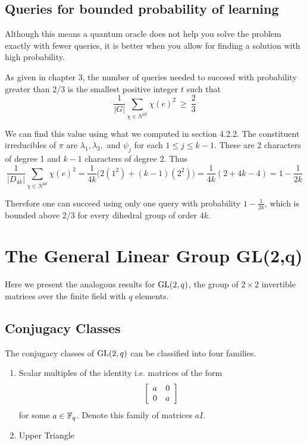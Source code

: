 \subsection{Queries for bounded probability of learning}
Although this means a quantum oracle does not help you solve the problem exactly with fewer queries, it is better 
when you allow for finding a solution with high probability.

As given in chapter 3, the number of queries needed to succeed with probability greater than 2/3 is the smallest 
positive integer $t$ such that
\[
    \frac{1}{|G|} \sum_{\chi \in N^{\otimes t}} \chi(e)^2  \ \geq\  \frac{2}{3}
\]

We can find this value using what we computed in section 4.2.2.  The constituent irreducibles of $\pi$ are 
$\lambda_1, \lambda_3,$ and $\psi_j$ for each $1 \leq j \leq k-1$. These are 2 characters of degree 1 and $k-1$ 
characters of degree 2. Thus
\[
    \frac{1}{|D_{4k}|} \sum_{\chi \in N^{\otimes t}} \chi(e)^2 = \frac{1}{4k}\bigl( 2(1^2) + (k-1)(2^2) \bigr) = 
    \frac{1}{4k}(2 + 4k - 4) = 1 - \frac{1}{2k}
\]

Therefore one can succeed using only one query with probability $1 - \frac{1}{2k}$, which is bounded above 2/3 for 
every dihedral group of order $4k$.

\section{The General Linear Group GL(2,q)}

Here we present the analogous results for $\operatorname{GL}(2, q)$, the group of $2 \times 2$ invertible matrices over the 
finite field with $q$ elements. 



\subsection{Conjugacy Classes}

The conjugacy classes of $\operatorname{GL}(2,q)$ can be classified into four families.
\begin{enumerate}
    \item Scalar multiples of the identity i.e. matrices of the form
        \[
            \left[\begin{array}{rr}a&0\\0&a\end{array}\right] 
        \]
        for some $a \in \mathbb{F}_q$. Denote this family of matrices $aI$.
    \item Upper Triangle 
\end{enumerate}









 


